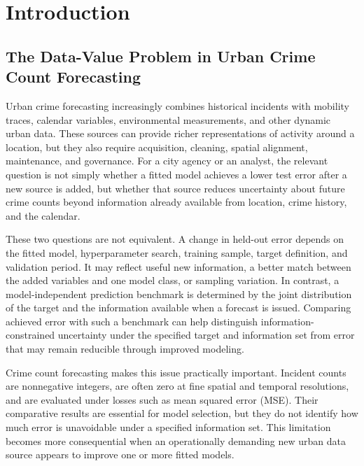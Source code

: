 \section{Introduction}
\label{sec:introduction}

\subsection{The Data-Value Problem in Urban Crime Count Forecasting}
\label{subsec:intro_data_value}

Urban crime forecasting increasingly combines historical incidents with
mobility traces, calendar variables, environmental measurements, and other
dynamic urban data. These sources can provide richer representations of activity
around a location, but they also require acquisition, cleaning, spatial
alignment, maintenance, and governance. For a city agency or an analyst, the
relevant question is not simply whether a fitted model achieves a
lower test error after a new source is added, but whether that source
reduces uncertainty about future crime counts beyond information already
available from location, crime history, and the calendar.

These two questions are not equivalent. A change in held-out error depends on
the fitted model, hyperparameter search, training sample, target definition,
and validation period. It may reflect useful new information, a better match
between the added variables and one model class, or sampling variation. In
contrast, a model-independent prediction benchmark is determined by the joint
distribution of the target and the information available when a forecast is
issued. Comparing achieved error with such a benchmark can help distinguish
information-constrained uncertainty under the specified target and
information set from error that may remain reducible through improved
modeling.

Crime count forecasting makes this issue practically important.
Incident counts are nonnegative integers, are often zero at fine spatial and
temporal resolutions, and are evaluated under losses such as mean squared
error (MSE).  Their comparative results are essential for model selection,
but they do not identify how much error is unavoidable under a specified
information set. This limitation becomes more consequential when an
operationally demanding new urban data source appears to improve one or more
fitted models.


